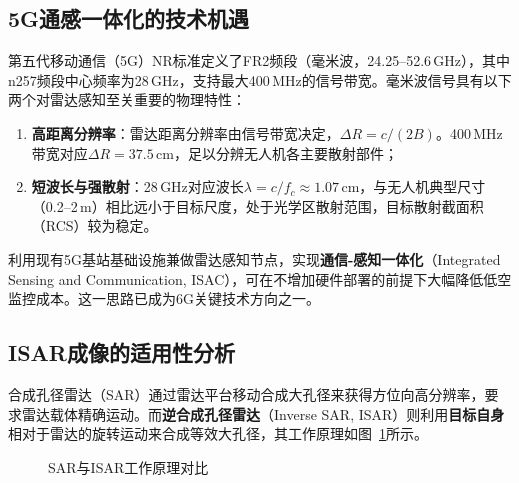\documentclass[12pt, a4paper]{article}
\begin{document}
\subsection{5G通感一体化的技术机遇}

第五代移动通信（5G）NR标准定义了FR2频段（毫米波，24.25--52.6\,GHz），其中n257频段中心频率为28\,GHz，支持最大400\,MHz的信号带宽\cite{ref_3gpp}。毫米波信号具有以下两个对雷达感知至关重要的物理特性：

\begin{enumerate}
  \item \textbf{高距离分辨率}：雷达距离分辨率由信号带宽决定，$\Delta R = c/(2B)$。400\,MHz带宽对应$\Delta R = 37.5\,$cm，足以分辨无人机各主要散射部件；
  \item \textbf{短波长与强散射}：28\,GHz对应波长$\lambda = c/f_c \approx 1.07\,$cm，与无人机典型尺寸（0.2--2\,m）相比远小于目标尺度，处于光学区散射范围，目标散射截面积（RCS）较为稳定。
\end{enumerate}

利用现有5G基站基础设施兼做雷达感知节点，实现\textbf{通信-感知一体化}（Integrated Sensing and Communication, ISAC），可在不增加硬件部署的前提下大幅降低低空监控成本\cite{ref_isac_survey}。这一思路已成为6G关键技术方向之一。

\subsection{ISAR成像的适用性分析}

合成孔径雷达（SAR）通过雷达平台移动合成大孔径来获得方位向高分辨率，要求雷达载体精确运动。而\textbf{逆合成孔径雷达}（Inverse SAR, ISAR）则利用\textbf{目标自身}相对于雷达的旋转运动来合成等效大孔径\cite{ref_isar_chen}，其工作原理如图~\ref{fig:sar_vs_isar}所示。

\begin{figure}[H]
\centering
{}
\caption{SAR与ISAR工作原理对比}
\label{fig:sar_vs_isar}
\end{figure}
\end{document}
